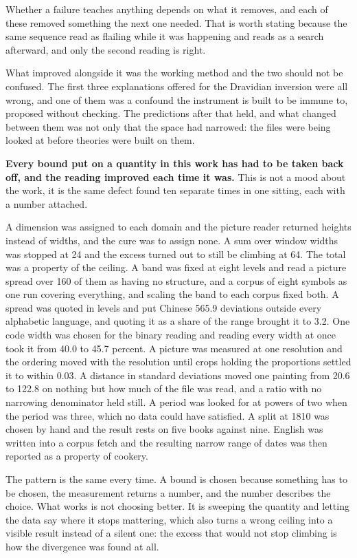 Whether a failure teaches anything depends on what it removes, and each of these removed something the next one needed. That is worth stating because the same sequence read as flailing while it was happening and reads as a search afterward, and only the second reading is right.

What improved alongside it was the working method and the two should not be confused. The first three explanations offered for the Dravidian inversion were all wrong, and one of them was a confound the instrument is built to be immune to, proposed without checking. The predictions after that held, and what changed between them was not only that the space had narrowed: the files were being looked at before theories were built on them.

\textbf{Every bound put on a quantity in this work has had to be taken back off, and the reading improved each time it was.} This is not a mood about the work, it is the same defect found ten separate times in one sitting, each with a number attached.

A dimension was assigned to each domain and the picture reader returned heights instead of widths, and the cure was to assign none. A sum over window widths was stopped at 24 and the excess turned out to still be climbing at 64. The total was a property of the ceiling. A band was fixed at eight levels and read a picture spread over 160 of them as having no structure, and a corpus of eight symbols as one run covering everything, and scaling the band to each corpus fixed both. A spread was quoted in levels and put Chinese 565.9 deviations outside every alphabetic language, and quoting it as a share of the range brought it to 3.2. One code width was chosen for the binary reading and reading every width at once took it from 40.0 to 45.7 percent. A picture was measured at one resolution and the ordering moved with the resolution until crops holding the proportions settled it to within 0.03. A distance in standard deviations moved one painting from 20.6 to 122.8 on nothing but how much of the file was read, and a ratio with no narrowing denominator held still. A period was looked for at powers of two when the period was three, which no data could have satisfied. A split at 1810 was chosen by hand and the result rests on five books against nine. English was written into a corpus fetch and the resulting narrow range of dates was then reported as a property of cookery.

The pattern is the same every time. A bound is chosen because something has to be chosen, the measurement returns a number, and the number describes the choice. What works is not choosing better. It is sweeping the quantity and letting the data say where it stops mattering, which also turns a wrong ceiling into a visible result instead of a silent one: the excess that would not stop climbing is how the divergence was found at all.

